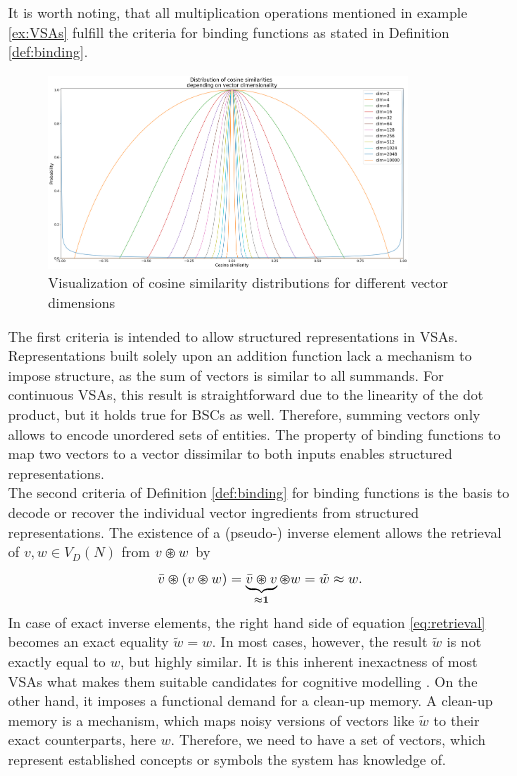 It is worth noting, that all multiplication operations mentioned in example \ref{ex:VSAs} fulfill the criteria for binding functions as stated in Definition \ref{def:binding}. 
\begin{figure}[t!]
	\centering
	\includegraphics[width=0.85\textwidth]{imgs/distributions_cosine_sims.eps}
	\caption{Visualization of cosine similarity distributions for different vector dimensions }
	\label{fig:cosine_dist}
\end{figure}
The first criteria is intended to allow structured representations in \acp{VSA}.
Representations built solely upon an addition function lack a mechanism to impose structure, as the sum of vectors is similar to all summands.
For continuous \acp{VSA}, this result is straightforward due to the linearity of the dot product, but it holds true for \acp{BSC} as well.
Therefore, summing vectors only allows to encode unordered sets of entities.
The property of binding functions to map two vectors to a vector dissimilar to both inputs enables structured representations.\\
The second criteria of Definition \ref{def:binding} for binding functions is the basis to decode or recover the individual vector ingredients from structured representations.
The existence of a (pseudo-) inverse element allows the retrieval of $v,w \in V_{D}(N)$ from $v \varoast w$ by
\begin{equation}
\label{eq:retrieval}
\bar{v} \varoast \left(v \varoast w\right) = \underbrace{\bar{v} \varoast v}_{\approx \bf{1}} \varoast w = \tilde{w} \approx w.
\end{equation}
In case of exact inverse elements, the right hand side of equation \ref{eq:retrieval} becomes an exact equality $\tilde{w}=w$.
In most cases, however, the result $\tilde{w}$ is not exactly equal to $w$, but highly similar.
It is this inherent inexactness of most \acp{VSA} what makes them suitable candidates for cognitive modelling \cite{Eliasmith2013}.
On the other hand, it imposes a functional demand for a clean-up memory.
A clean-up memory is a mechanism, which maps noisy versions of vectors like $\tilde{w}$ to their exact counterparts, here $w$.
Therefore, we need to have a set of vectors, which represent established concepts or symbols the system has knowledge of.

